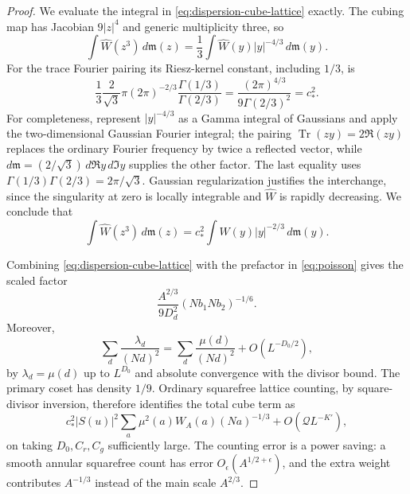 \begin{proof}
We evaluate the integral in \eqref{eq:dispersion-cube-lattice} exactly.
The cubing map has Jacobian $9|z|^4$ and generic multiplicity three, so
\[
 \int\widehat W(z^3)\,d\mathfrak m(z)
 =\frac13\int\widehat W(y)|y|^{-4/3}\,d\mathfrak m(y).
\]
For the trace Fourier pairing its Riesz-kernel constant, including
$1/3$, is
\[
 \frac13\frac2{\sqrt3}\pi(2\pi)^{-2/3}
       \frac{\Gamma(1/3)}{\Gamma(2/3)}
 =\frac{(2\pi)^{4/3}}{9\Gamma(2/3)^2}=c_*^2.
\]
For completeness, represent $|y|^{-4/3}$ as a Gamma integral of
Gaussians and apply the two-dimensional Gaussian Fourier integral;
the pairing $\operatorname{Tr}(zy)=2\Re(zy)$ replaces the ordinary
Fourier frequency by twice a reflected vector, while
$d\mathfrak m=(2/\sqrt3)\,d\Re y\,d\Im y$ supplies the other factor.
The last equality uses
$\Gamma(1/3)\Gamma(2/3)=2\pi/\sqrt3$. Gaussian regularization
justifies the interchange, since the singularity at zero is locally
integrable and $\widehat W$ is rapidly decreasing. We conclude that
\begin{equation}
 \int\widehat W(z^3)\,d\mathfrak m(z)
 =c_*^2\int W(y)|y|^{-2/3}\,d\mathfrak m(y).
 \label{eq:dispersion-riesz}
\end{equation}

Combining \eqref{eq:dispersion-cube-lattice} with the prefactor in
\eqref{eq:poisson} gives the scaled factor
\[
 \frac{A^{2/3}}{9D_d^2}(Nb_1Nb_2)^{-1/6}.
\]
Moreover,
\[
 \sum_d\frac{\lambda_d}{(Nd)^2}
 =\sum_d\frac{\mu(d)}{(Nd)^2}+O(L^{-D_0/2}),
\]
by $\lambda_d=\mu(d)$ up to $L^{D_0}$ and absolute convergence with
the divisor bound. The primary coset has density $1/9$. Ordinary
squarefree lattice counting, by square-divisor inversion, therefore
identifies the total cube term as
\begin{equation}
 c_*^2|S(u)|^2\sum_a\mu^2(a)W_A(a)(Na)^{-1/3}
       +O(\mathcal Q L^{-K'}),
 \label{eq:dispersion-cube-main}
\end{equation}
on taking $D_0,C_r,C_g$ sufficiently large. The counting error is a
power saving: a smooth annular squarefree count has error
$O_\epsilon(A^{1/2+\epsilon})$, and the extra weight contributes
$A^{-1/3}$ instead of the main scale $A^{2/3}$.


\end{proof}
